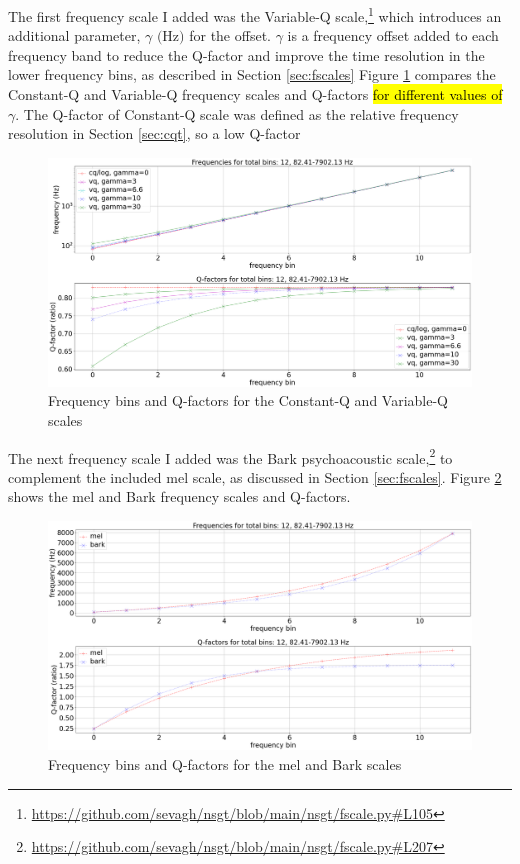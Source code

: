 \documentclass[report.tex]{subfiles}
\begin{document}
The first frequency scale I added was the Variable-Q scale,\footnote{\url{https://github.com/sevagh/nsgt/blob/main/nsgt/fscale.py\#L105}} which introduces an additional parameter, $\gamma \text{ (Hz)}$ for the offset. $\gamma$ is a frequency offset added to each frequency band to reduce the Q-factor and improve the time resolution in the lower frequency bins, as described in Section \ref{sec:fscales} Figure \ref{fig:vq} compares the Constant-Q and Variable-Q frequency scales and Q-factors \hl{for different values of} $\gamma$. The Q-factor of Constant-Q scale was defined as the relative frequency resolution in Section \ref{sec:cqt}, so a low Q-factor

\begin{figure}[ht]
	\centering
	\includegraphics[width=\textwidth]{./images-freqscales/vqlog.png}
	\caption{Frequency bins and Q-factors for the Constant-Q and Variable-Q scales}
	\label{fig:vq}
\end{figure}

The next frequency scale I added was the Bark psychoacoustic scale,\footnote{\url{https://github.com/sevagh/nsgt/blob/main/nsgt/fscale.py\#L207}} to complement the included mel scale, as discussed in Section \ref{sec:fscales}. Figure \ref{fig:melbarkfsandqs} shows the mel and Bark frequency scales and Q-factors.

\begin{figure}[ht]
	\centering
	\includegraphics[width=\textwidth]{./images-freqscales/melbarkpitchesqs.png}
	\caption{Frequency bins and Q-factors for the mel and Bark scales}
	\label{fig:melbarkfsandqs}
\end{figure}
\end{document}
